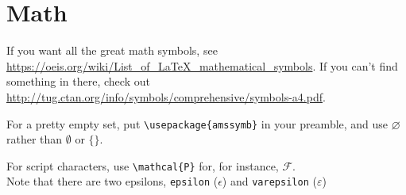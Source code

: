 \section{Math}
If you want all the great math symbols, see \url{https://oeis.org/wiki/List_of_LaTeX_mathematical_symbols}. If you can't find something in there, check out \url{http://tug.ctan.org/info/symbols/comprehensive/symbols-a4.pdf}.

For a pretty empty set, put \verb+\usepackage{amssymb}+ in your preamble, and use $\varnothing$ rather than $\emptyset$ or $\{\}$.


For script characters, use \verb+\mathcal{P}+ for, for instance, $\mathcal{F}$. \\

Note that there are two epsilons, \verb+epsilon+ ($\epsilon$) and \verb+varepsilon+ ($\varepsilon$)

